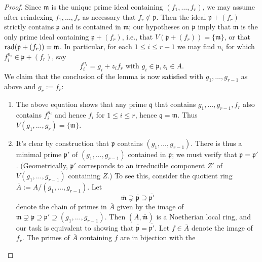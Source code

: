 \documentclass[10pt]{article}
\begin{document}
\begin{proof}
  Since $\mathfrak{m}$ is the unique prime ideal containing
  $(f_1,\dotsc,f_r)$,
  we may assume after reindexing $f_1,\dotsc,f_r$ as necessary
  that $f_r \notin \mathfrak{p}$.
  Then the ideal $\mathfrak{p} + (f_r)$ strictly contains
  $\mathfrak{p}$
  and is contained in $\mathfrak{m}$;
  our hypotheses on $\mathfrak{p}$ imply that
  $\mathfrak{m}$ is the only prime ideal
  containing $\mathfrak{p}  + (f_r)$,
  i.e., that
  $V(\mathfrak{p} + (f_r)) = \{\mathfrak{m}\}$,
  or that $\operatorname{rad}(\mathfrak{p} + (f_r)) = \mathfrak{m}$.
  In particular,
  for each $1 \leq i \leq r-1$
  we may find $n_i$
  for which $f_i^{n_i} \in \mathfrak{p} + (f_r)$,
  say
  \[
    f_i^{n_i} = g_i + z_i f_r
    \text{ with } g_i \in \mathfrak{p}, z_i \in A.
  \]
  We claim that the conclusion of the lemma is now satisfied
  with $g_1,\dotsc,g_{r-1}$ as above and $g_r := f_r$:
  \begin{enumerate}
  \item The above equation
    shows that any prime $\mathfrak{q}$ that contains
    $g_1,\dotsc,g_{r-1},f_r$
    also contains $f_i^{n_i}$ and hence $f_i$ for $1 \leq i \leq r$,
    hence $\mathfrak{q} = \mathfrak{m}$.
    Thus $V(g_1,\dotsc,g_r) = \{\mathfrak{m}\}$.
  \item It's clear by construction that $\mathfrak{p}$ contains
    $(g_1,\dotsc,g_{r-1})$.  There is thus a minimal prime
    $\mathfrak{p}'$ of $(g_1,\dotsc,g_{r-1})$ contained in
    $\mathfrak{p}$; we must verify that
    $\mathfrak{p} = \mathfrak{p} '$.  (Geometrically,
    $\mathfrak{p}'$ corresponds to an irreducible component $Z'$
    of $V(g_1,\dotsc,g_{r-1})$ containing $Z$.)  To see this,
    consider the quotient ring $\overline{A} := A/(g_1,\dotsc,g_{r-1})$.
    Let
    \begin{equation}\label{eq:prime-chain-in-quotient-for-key-lemma-of-dimn-thm}
            \overline{\mathfrak{m}} \supsetneq
      \overline{\mathfrak{p}} \supseteq \overline{\mathfrak{p}'}
    \end{equation}
    denote the chain of primes in $\overline{A}$
    given by the image of
    $\mathfrak{m} \supsetneq \mathfrak{p} \supseteq
    \mathfrak{p}' \supseteq (g_1,\dotsc,g_{r-1})$.
    Then $(\overline{A},\overline{\mathfrak{m}})$ is a
    Noetherian local ring,
    and our task is equivalent to showing that
    $\overline{\mathfrak{p} } = \overline{\mathfrak{p} '}$.
    Let
    $f \in \overline{A}$ denote the image of $f_r$.  The primes
    of $\overline{A}$ containing $f$ are in bijection with the

\end{enumerate}
\end{proof}
\end{document}
